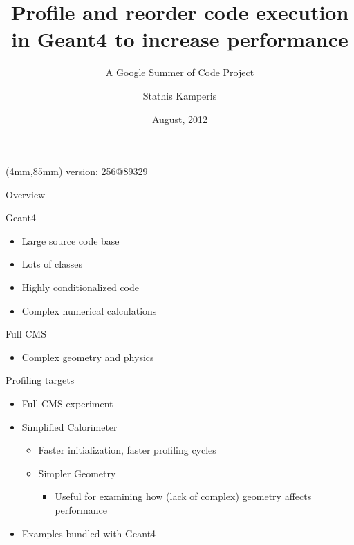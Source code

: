 \documentclass{beamer}
\newenvironment{reference}[2]{%
  \begin{textblock*}{\textwidth}(#1,#2) 
      \tiny\bgroup\color{red!50!black}}{\egroup\end{textblock*}}
\begin{document}
\title{Profile and reorder code execution in Geant4 to increase performance}
\subtitle{A Google Summer of Code Project}
\author{Stathis Kamperis}
\date{August, 2012}

\begin{frame}[plain]
  \titlepage
\begin{reference}{4mm}{85mm}
version: 256@89329
\end{reference} 
\end{frame}

\begin{frame}{Overview}

Geant4
\begin{itemize}
  \item Large source code base
  \item Lots of classes
  \item Highly conditionalized code
  \item Complex numerical calculations
\end{itemize}

Full CMS
\begin{itemize}
\item Complex geometry and physics
\end{itemize}

\begin{center}
\end{center}
\end{frame}

\begin{frame}{Profiling targets}
\begin{itemize}
\item Full CMS experiment
\item Simplified Calorimeter
\begin{itemize}
\item Faster initialization, faster profiling cycles
\item Simpler Geometry
\begin{itemize}
\item Useful for examining how (lack of complex) geometry affects performance
\end{itemize}
\end{itemize}
\item Examples bundled with Geant4
\end{itemize}
\end{frame}
\end{document}
